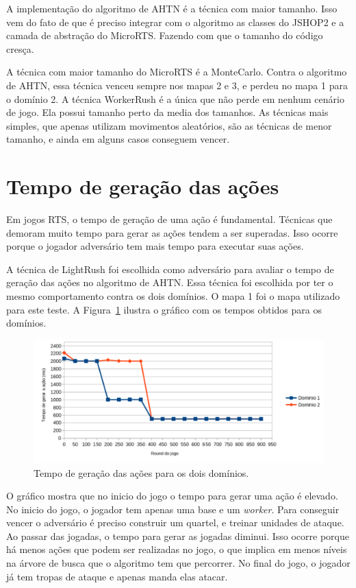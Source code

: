 A implementação do algoritmo de AHTN é a técnica com maior tamanho.
Isso vem do fato de que é preciso integrar com o algoritmo as classes do JSHOP2 e a camada de abstração do MicroRTS.
Fazendo com que o tamanho do código cresça.

A técnica com maior tamanho do MicroRTS é a MonteCarlo.
Contra o algoritmo de AHTN, essa técnica venceu sempre nos mapas 2 e 3, e perdeu no mapa 1 para o domínio 2.
A técnica WorkerRush é a única que não perde em nenhum cenário de jogo.
Ela possui tamanho perto da media dos tamanhos.
As técnicas mais simples, que apenas utilizam movimentos aleatórios, são as técnicas de menor tamanho, e ainda em alguns casos conseguem vencer.

\section{Tempo de geração das ações}

Em jogos RTS, o tempo de geração de uma ação é fundamental.
Técnicas que demoram muito tempo para gerar as ações tendem a ser superadas.
Isso ocorre porque o jogador adversário tem mais tempo para executar suas ações.

A técnica de LightRush foi escolhida como adversário para avaliar o tempo de geração das ações no algoritmo de AHTN.
Essa técnica foi escolhida por ter o mesmo comportamento contra os dois domínios.
O mapa 1 foi o mapa utilizado para este teste.
A Figura~\ref{fig:tempo} ilustra o gráfico com os tempos obtidos para os domínios.

\begin{figure}[ht]
	\centering
	\includegraphics[width=.9\textwidth]{fig/graph.pdf}
	\caption{Tempo de geração das ações para os dois domínios.}
	\label{fig:tempo}
\end{figure}

O gráfico mostra que no inicio do jogo o tempo para gerar uma ação é elevado.
No inicio do jogo, o jogador tem apenas uma base e um \textit{worker}.
Para conseguir vencer o adversário é preciso construir um quartel, e treinar unidades de ataque.
Ao passar das jogadas, o tempo para gerar as jogadas diminui.
Isso ocorre porque há menos ações que podem ser realizadas no jogo, o que implica em menos níveis na árvore de busca que o algoritmo tem que percorrer.
No final do jogo, o jogador já tem tropas de ataque e apenas manda elas atacar.

